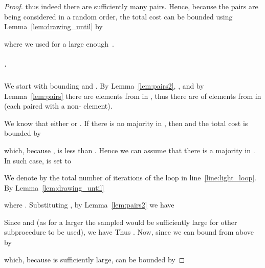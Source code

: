 \documentclass{article}[11pt,a4paper]
\begin{document}
\begin{proof}
thus indeed there are sufficiently many pairs. Hence, because the pairs are being considered in
a random order, the total cost can be bounded using Lemma~\ref{lem:drawing_until} by

where we used 
for a large enough~.

\subparagraph*{{\normalfont }.}
We start with bounding  and . By Lemma~\ref{lem:pairs2},
, and by Lemma~\ref{lem:pairs} there
are  elements from  in , thus there are
 of elements from  in  (each paired with
a non- element).

We know that either  or .
If there is no majority in , then  and the total cost is bounded by

which, because , is less than .
Hence we can assume that there is a majority in . In such case,  is set to

We denote by  the total number of iterations of the loop in line~\ref{line:light_loop}.
By Lemma~\ref{lem:drawing_until}

where .
Substituting , by Lemma~\ref{lem:pairs2} we have

Since  and  (as for a larger  the sampled
 would be sufficiently large for other subprocedure to be used),
we have  Thus  . Now, since  we can bound  from above by

which, because  is sufficiently large, can be bounded by



\end{proof}
\end{document}
